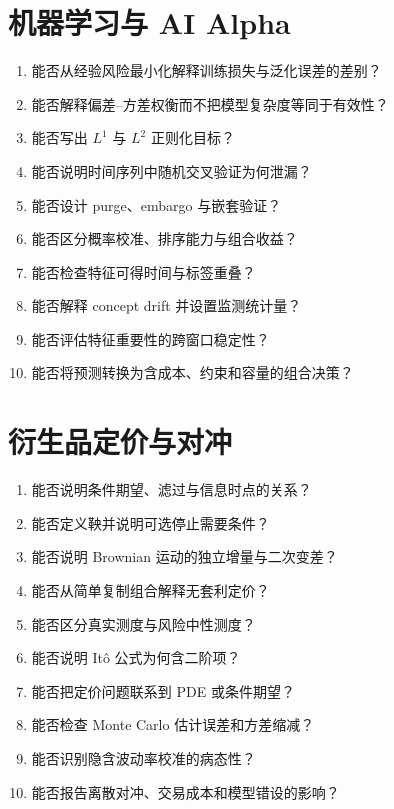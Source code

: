 \section{机器学习与 AI Alpha}\label{route:ml-alpha}

\begin{enumerate}
  \item 能否从经验风险最小化解释训练损失与泛化误差的差别？
  \item 能否解释偏差--方差权衡而不把模型复杂度等同于有效性？
  \item 能否写出 $L^1$ 与 $L^2$ 正则化目标？
  \item 能否说明时间序列中随机交叉验证为何泄漏？
  \item 能否设计 purge、embargo 与嵌套验证？
  \item 能否区分概率校准、排序能力与组合收益？
  \item 能否检查特征可得时间与标签重叠？
  \item 能否解释 concept drift 并设置监测统计量？
  \item 能否评估特征重要性的跨窗口稳定性？
  \item 能否将预测转换为含成本、约束和容量的组合决策？
\end{enumerate}
\RouteScoreInterpretation

\section{衍生品定价与对冲}\label{route:derivatives}

\begin{enumerate}
  \item 能否说明条件期望、滤过与信息时点的关系？
  \item 能否定义鞅并说明可选停止需要条件？
  \item 能否说明 Brownian 运动的独立增量与二次变差？
  \item 能否从简单复制组合解释无套利定价？
  \item 能否区分真实测度与风险中性测度？
  \item 能否说明 It\^o 公式为何含二阶项？
  \item 能否把定价问题联系到 PDE 或条件期望？
  \item 能否检查 Monte Carlo 估计误差和方差缩减？
  \item 能否识别隐含波动率校准的病态性？
  \item 能否报告离散对冲、交易成本和模型错设的影响？
\end{enumerate}
\RouteScoreInterpretation

